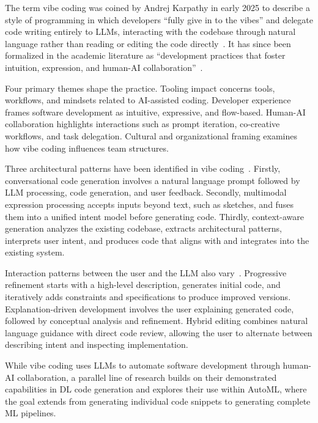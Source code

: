 \documentclass[
english,                 %
bibtex,                  %
]{kththesis}
\numberwithin{listing}{chapter}
\begin{document}
The term vibe coding was coined by Andrej Karpathy in early 2025 to describe a style of programming in which developers ``fully give in to the vibes'' and delegate code writing entirely to \glspl{LLM}, interacting with the codebase through natural language rather than reading or editing the code directly~\cite{karpathy_theres_2025}. It has since been formalized in the academic literature as ``development practices that foster intuition, expression, and human-\gls{AI} collaboration''~\cite{beaulieu_vibe_2025}.

Four primary themes shape the practice. Tooling impact concerns tools, workflows, and mindsets related to \gls{AI}-assisted coding. Developer experience frames software development as intuitive, expressive, and flow-based. Human-\gls{AI} collaboration highlights interactions such as prompt iteration, co-creative workflows, and task delegation. Cultural and organizational framing examines how vibe coding influences team structures.

Three architectural patterns have been identified in vibe coding~\cite{akhilesh_gadde_democratizing_2025}. Firstly, conversational code generation involves a natural language prompt followed by \gls{LLM} processing, code generation, and user feedback. Secondly, multimodal expression processing accepts inputs beyond text, such as sketches, and fuses them into a unified intent model before generating code. Thirdly, context-aware generation analyzes the existing codebase, extracts architectural patterns, interprets user intent, and produces code that aligns with and integrates into the existing system.

Interaction patterns between the user and the \gls{LLM} also vary~\cite{akhilesh_gadde_democratizing_2025}. Progressive refinement starts with a high-level description, generates initial code, and iteratively adds constraints and specifications to produce improved versions. Explanation-driven development involves the user explaining generated code, followed by conceptual analysis and refinement. Hybrid editing combines natural language guidance with direct code review, allowing the user to alternate between describing intent and inspecting implementation.

While vibe coding uses \glspl{LLM} to automate software development through human-\gls{AI} collaboration, a parallel line of research builds on their demonstrated capabilities in \gls{DL} code generation and explores their use within \gls{AutoML}, where the goal extends from generating individual code snippets to generating complete \gls{ML} pipelines.
\end{document}
